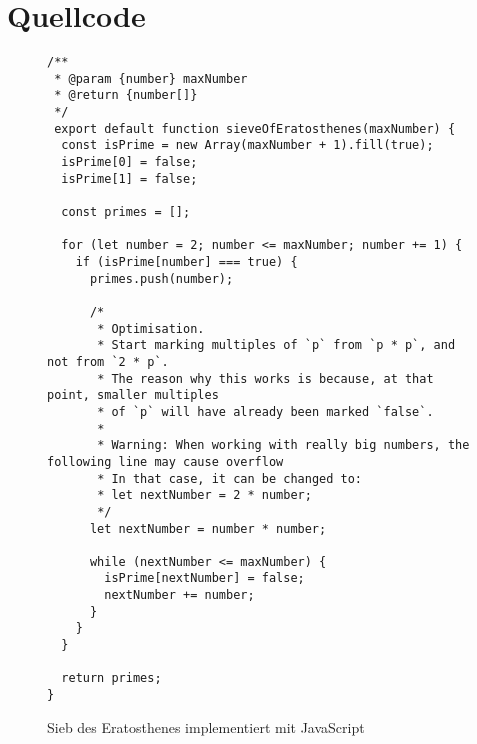 \chapter{Quellcode}

\begin{figure}[H]
  \begin{codebox}[]
    \begin{verbatim}
/**
 * @param {number} maxNumber
 * @return {number[]}
 */
 export default function sieveOfEratosthenes(maxNumber) {
  const isPrime = new Array(maxNumber + 1).fill(true);
  isPrime[0] = false;
  isPrime[1] = false;

  const primes = [];

  for (let number = 2; number <= maxNumber; number += 1) {
    if (isPrime[number] === true) {
      primes.push(number);

      /*
       * Optimisation.
       * Start marking multiples of `p` from `p * p`, and not from `2 * p`.
       * The reason why this works is because, at that point, smaller multiples
       * of `p` will have already been marked `false`.
       *
       * Warning: When working with really big numbers, the following line may cause overflow
       * In that case, it can be changed to:
       * let nextNumber = 2 * number;
       */
      let nextNumber = number * number;

      while (nextNumber <= maxNumber) {
        isPrime[nextNumber] = false;
        nextNumber += number;
      }
    }
  }

  return primes;
}
    \end{verbatim}
  \end{codebox}
  \caption[\enquote{Sieb des Eratosthenes implementiert mit JavaScript} visualisiert mit Minted]{Sieb des Eratosthenes implementiert mit JavaScript}
  \label{fig:sieve-of-eratosthenes}
\end{figure}